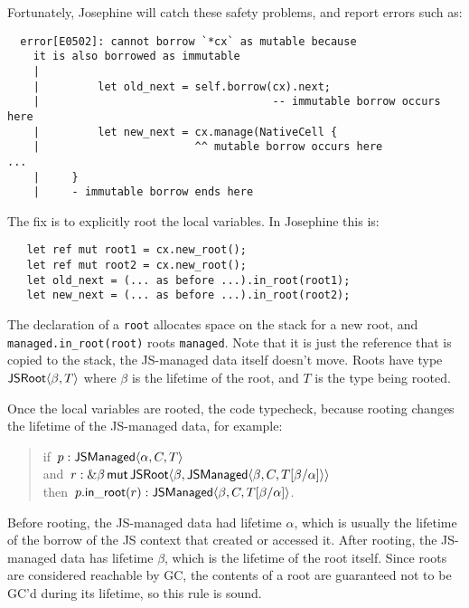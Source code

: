 Fortunately, Josephine will catch these safety problems, and report
errors such as:
\begin{verbatim}
  error[E0502]: cannot borrow `*cx` as mutable because
    it is also borrowed as immutable
    |
    |         let old_next = self.borrow(cx).next;
    |                                    -- immutable borrow occurs here
    |         let new_next = cx.manage(NativeCell {
    |                        ^^ mutable borrow occurs here
...
    |     }
    |     - immutable borrow ends here
\end{verbatim}
The fix is to explicitly root the local variables. In Josephine this is:
\begin{verbatim}
   let ref mut root1 = cx.new_root();
   let ref mut root2 = cx.new_root();
   let old_next = (... as before ...).in_root(root1);
   let new_next = (... as before ...).in_root(root2);
\end{verbatim}
The declaration of a \verb|root| allocates space on the stack
for a new root, and \verb|managed.in_root(root)| roots \verb|managed|.
Note that it is just the reference that is copied to the stack,
the JS-managed data itself doesn't move.
Roots have type $\mathsf{JSRoot}\langle \beta,T\rangle$ where $\beta$ is the lifetime
of the root, and $T$ is the type being rooted.

Once the local variables are rooted, the code typecheck,
because rooting changes the lifetime of the JS-managed
data, for example:
\begin{quote}
  if~$p: \mathsf{JSManaged}\langle \alpha,C,T\rangle$ \\
  and~$r: \&\beta\,\mathsf{mut}\,{\mathsf{JSRoot}\langle \beta,\mathsf{JSManaged}\langle \beta,C,T[\beta/\alpha]\rangle\rangle}$ \\
  then~$p.\mathsf{in\_root}(r): \mathsf{JSManaged}\langle \beta,C,T[\beta/\alpha]\rangle$.
\end{quote}
Before rooting, the JS-managed data had lifetime $\alpha$,
which is usually the lifetime of the borrow of the JS context
that created or accessed it.
After rooting, the JS-managed data has lifetime $\beta$,
which is the lifetime of the root itself. Since roots are
considered reachable by GC, the contents of a root
are guaranteed not to be GC'd during its lifetime,
so this rule is sound.
